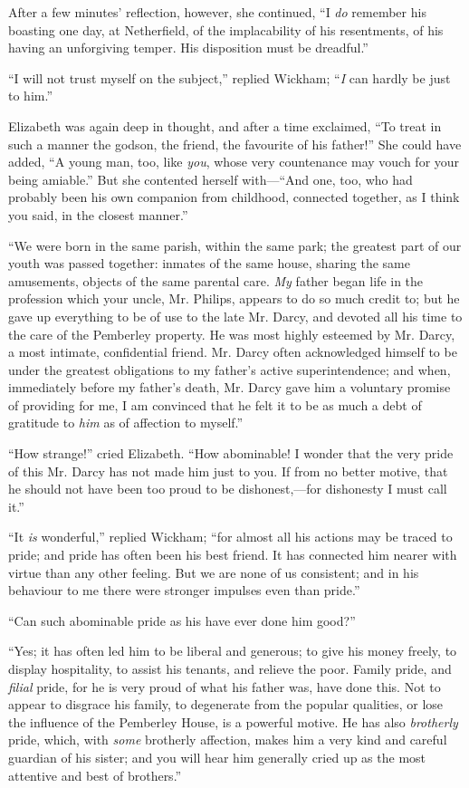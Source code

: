 \documentclass[12pt]{book}
\begin{document}
After a few minutes' reflection, however, she continued, ``I \textit{do} remember his boasting one day, at Netherfield, of the implacability of his resentments, of his having an unforgiving temper. His disposition must be dreadful.''

``I will not trust myself on the subject,'' replied Wickham; ``\textit{I} can hardly be just to him.''

Elizabeth was again deep in thought, and after a time exclaimed, ``To treat in such a manner the godson, the friend, the favourite of his father!'' She could have added, ``A young man, too, like \textit{you}, whose very countenance may vouch for your being amiable.'' But she contented herself with---``And one, too, who had probably been his own companion from childhood, connected together, as I think you said, in the closest manner.''

``We were born in the same parish, within the same park; the greatest part of our youth was passed together: inmates of the same house, sharing the same amusements, objects of the same parental care. \textit{My} father began life in the profession which your uncle, Mr. Philips, appears to do so much credit to; but he gave up everything to be of use to the late Mr. Darcy, and devoted all his time to the care of the Pemberley property. He was most highly esteemed by Mr. Darcy, a most intimate, confidential friend. Mr. Darcy often acknowledged himself to be under the greatest obligations to my father's active superintendence; and when, immediately before my father's death, Mr. Darcy gave him a voluntary promise of providing for me, I am convinced that he felt it to be as much a debt of gratitude to \textit{him} as of affection to myself.''

``How strange!'' cried Elizabeth. ``How abominable! I wonder that the very pride of this Mr. Darcy has not made him just to you. If from no better motive, that he should not have been too proud to be dishonest,---for dishonesty I must call it.''

``It \textit{is} wonderful,'' replied Wickham; ``for almost all his actions may be traced to pride; and pride has often been his best friend. It has connected him nearer with virtue than any other feeling. But we are none of us consistent; and in his behaviour to me there were stronger impulses even than pride.''

``Can such abominable pride as his have ever done him good?''

``Yes; it has often led him to be liberal and generous; to give his money freely, to display hospitality, to assist his tenants, and relieve the poor. Family pride, and \textit{filial} pride, for he is very proud of what his father was, have done this. Not to appear to disgrace his family, to degenerate from the popular qualities, or lose the influence of the Pemberley House, is a powerful motive. He has also \textit{brotherly} pride, which, with \textit{some} brotherly affection, makes him a very kind and careful guardian of his sister; and you will hear him generally cried up as the most attentive and best of brothers.''
\end{document}
